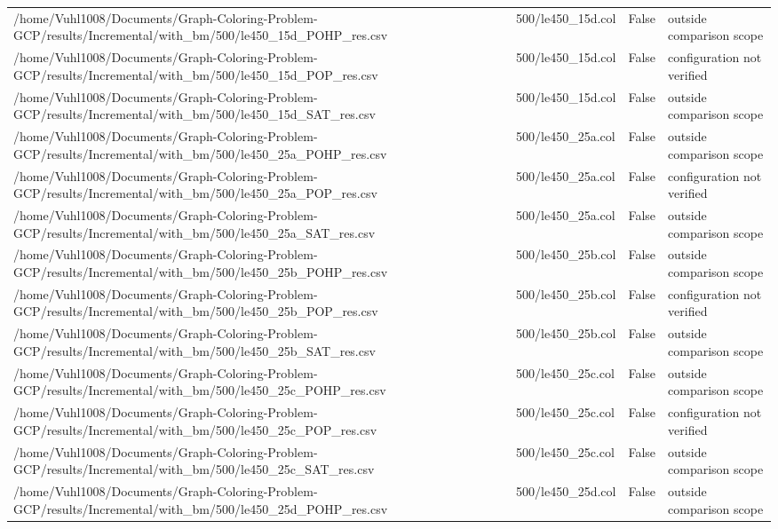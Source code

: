 \begin{table}[htbp]
\begin{tabular}{llll}
/home/Vuhl1008/Documents/Graph-Coloring-Problem-GCP/results/Incremental/with\_bm/500/le450\_15d\_POHP\_res.csv & 500/le450\_15d.col & False & outside comparison scope \\
/home/Vuhl1008/Documents/Graph-Coloring-Problem-GCP/results/Incremental/with\_bm/500/le450\_15d\_POP\_res.csv & 500/le450\_15d.col & False & configuration not verified \\
/home/Vuhl1008/Documents/Graph-Coloring-Problem-GCP/results/Incremental/with\_bm/500/le450\_15d\_SAT\_res.csv & 500/le450\_15d.col & False & outside comparison scope \\
/home/Vuhl1008/Documents/Graph-Coloring-Problem-GCP/results/Incremental/with\_bm/500/le450\_25a\_POHP\_res.csv & 500/le450\_25a.col & False & outside comparison scope \\
/home/Vuhl1008/Documents/Graph-Coloring-Problem-GCP/results/Incremental/with\_bm/500/le450\_25a\_POP\_res.csv & 500/le450\_25a.col & False & configuration not verified \\
/home/Vuhl1008/Documents/Graph-Coloring-Problem-GCP/results/Incremental/with\_bm/500/le450\_25a\_SAT\_res.csv & 500/le450\_25a.col & False & outside comparison scope \\
/home/Vuhl1008/Documents/Graph-Coloring-Problem-GCP/results/Incremental/with\_bm/500/le450\_25b\_POHP\_res.csv & 500/le450\_25b.col & False & outside comparison scope \\
/home/Vuhl1008/Documents/Graph-Coloring-Problem-GCP/results/Incremental/with\_bm/500/le450\_25b\_POP\_res.csv & 500/le450\_25b.col & False & configuration not verified \\
/home/Vuhl1008/Documents/Graph-Coloring-Problem-GCP/results/Incremental/with\_bm/500/le450\_25b\_SAT\_res.csv & 500/le450\_25b.col & False & outside comparison scope \\
/home/Vuhl1008/Documents/Graph-Coloring-Problem-GCP/results/Incremental/with\_bm/500/le450\_25c\_POHP\_res.csv & 500/le450\_25c.col & False & outside comparison scope \\
/home/Vuhl1008/Documents/Graph-Coloring-Problem-GCP/results/Incremental/with\_bm/500/le450\_25c\_POP\_res.csv & 500/le450\_25c.col & False & configuration not verified \\
/home/Vuhl1008/Documents/Graph-Coloring-Problem-GCP/results/Incremental/with\_bm/500/le450\_25c\_SAT\_res.csv & 500/le450\_25c.col & False & outside comparison scope \\
/home/Vuhl1008/Documents/Graph-Coloring-Problem-GCP/results/Incremental/with\_bm/500/le450\_25d\_POHP\_res.csv & 500/le450\_25d.col & False & outside comparison scope \\

\end{tabular}
\end{table}

